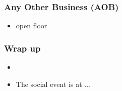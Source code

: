 \documentclass{beamer}
\begin{document}
\begin{frame}
    \frametitle{Any Other Business (AOB)}
    \begin{itemize}

        \item open floor
    \end{itemize}
\end{frame}

\begin{frame}
    \frametitle{Wrap up}
    \begin{itemize}
        \item
        \item The social event is at ...
    \end{itemize}
\end{frame}
\end{document}

